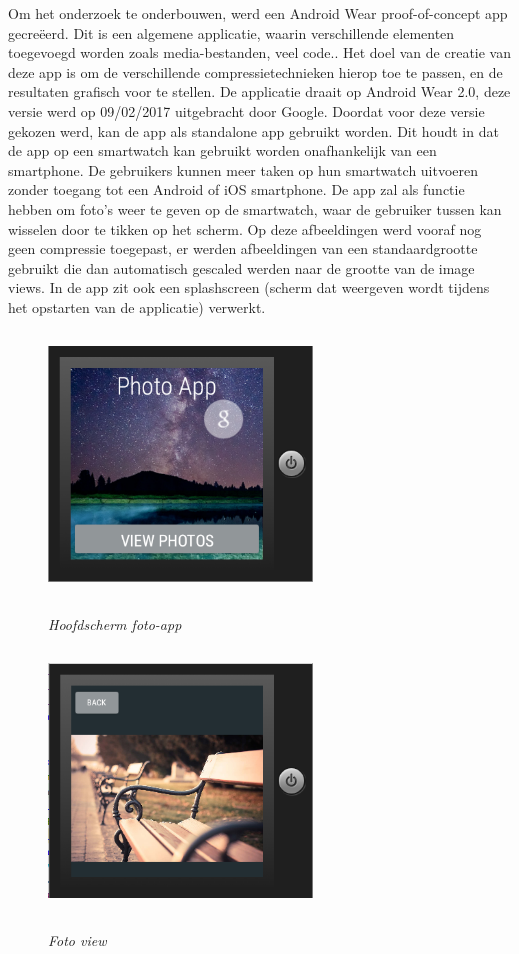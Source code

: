 Om het onderzoek te onderbouwen, werd een Android Wear proof-of-concept app gecreëerd. Dit is een algemene applicatie, waarin verschillende elementen toegevoegd worden zoals media-bestanden, veel code.. Het doel van de creatie van deze app is om de verschillende compressietechnieken hierop toe te passen, en de resultaten grafisch voor te stellen. De applicatie draait op Android Wear 2.0, deze versie werd op 09/02/2017 uitgebracht door Google.\autocite{Google} Doordat voor deze versie gekozen werd, kan de app als standalone app gebruikt worden. Dit houdt in dat de app op een smartwatch kan gebruikt worden onafhankelijk van een smartphone. De gebruikers kunnen meer taken op hun smartwatch uitvoeren zonder toegang tot een Android of iOS smartphone. De app zal als functie hebben om foto's weer te geven op de smartwatch, waar de gebruiker tussen kan wisselen door te tikken op het scherm. Op deze afbeeldingen werd vooraf nog geen compressie toegepast, er werden afbeeldingen van een standaardgrootte gebruikt die dan automatisch gescaled werden naar de grootte van de image views. In de app zit ook een splashscreen (scherm dat weergeven wordt tijdens het opstarten van de applicatie) verwerkt. 
\begin{figure}[H]
	\centering
	\caption{\textit{Hoofdscherm foto-app}}
	\includegraphics[width=7cm, height=7cm, keepaspectratio]{img/photoappmain}\\[.5cm]
\end{figure}
\begin{figure}[H]
	\centering
	\caption{\textit{Foto view}}
	\includegraphics[width=7cm, height=7cm, keepaspectratio]{img/photoappgallery}\\[.5cm]
	
\end{figure}

